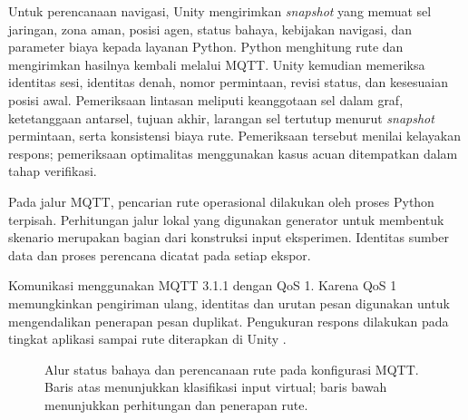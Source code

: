 \documentclass[10pt,a4paper]{article}
\begin{document}
Untuk perencanaan navigasi, Unity mengirimkan \emph{snapshot} yang memuat sel jaringan, zona aman, posisi agen, status bahaya, kebijakan navigasi, dan parameter biaya kepada layanan Python. Python menghitung rute dan mengirimkan hasilnya kembali melalui MQTT. Unity kemudian memeriksa identitas sesi, identitas denah, nomor permintaan, revisi status, dan kesesuaian posisi awal. Pemeriksaan lintasan meliputi keanggotaan sel dalam graf, ketetanggaan antarsel, tujuan akhir, larangan sel tertutup menurut \emph{snapshot} permintaan, serta konsistensi biaya rute. Pemeriksaan tersebut menilai kelayakan respons; pemeriksaan optimalitas menggunakan kasus acuan ditempatkan dalam tahap verifikasi.

Pada jalur MQTT, pencarian rute operasional dilakukan oleh proses Python terpisah. Perhitungan jalur lokal yang digunakan generator untuk membentuk skenario merupakan bagian dari konstruksi input eksperimen. Identitas sumber data dan proses perencana dicatat pada setiap ekspor.

Komunikasi menggunakan MQTT 3.1.1 dengan QoS 1. Karena QoS 1 memungkinkan pengiriman ulang, identitas dan urutan pesan digunakan untuk mengendalikan penerapan pesan duplikat. Pengukuran respons dilakukan pada tingkat aplikasi sampai rute diterapkan di Unity \cite{saha}.

\begin{figure}[!htbp]
\centering
{}
\caption{Alur status bahaya dan perencanaan rute pada konfigurasi MQTT. Baris atas menunjukkan klasifikasi input virtual; baris bawah menunjukkan perhitungan dan penerapan rute.}
\label{fig:architecture}
\end{figure}
\end{document}
